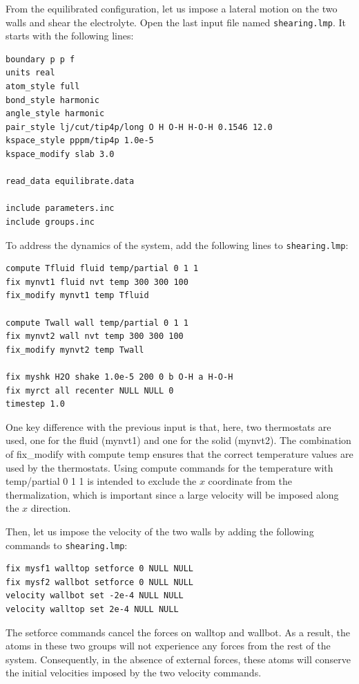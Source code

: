 \documentclass[9pt,tutorial]{livecoms}
\newcommand{\lmpcmd}[1]{\hspace{0pt}\colorbox{listing}{\textcolor{command}{\small{#1}}}\hspace{0pt}} %
\newcommand{\flecmd}[1]{\textcolor{command}{\texttt{#1}}} %
\begin{document}
From the equilibrated configuration, let us impose a lateral motion on the two
walls and shear the electrolyte.  Open the last input file named \flecmd{shearing.lmp}.
It starts with the following lines:
\begin{lstlisting}
boundary p p f
units real
atom_style full
bond_style harmonic
angle_style harmonic
pair_style lj/cut/tip4p/long O H O-H H-O-H 0.1546 12.0
kspace_style pppm/tip4p 1.0e-5
kspace_modify slab 3.0

read_data equilibrate.data

include parameters.inc
include groups.inc
\end{lstlisting}

To address the dynamics of the system, add the following lines to
\flecmd{shearing.lmp}:
\begin{lstlisting}
compute Tfluid fluid temp/partial 0 1 1
fix mynvt1 fluid nvt temp 300 300 100
fix_modify mynvt1 temp Tfluid

compute Twall wall temp/partial 0 1 1
fix mynvt2 wall nvt temp 300 300 100
fix_modify mynvt2 temp Twall

fix myshk H2O shake 1.0e-5 200 0 b O-H a H-O-H
fix myrct all recenter NULL NULL 0
timestep 1.0
\end{lstlisting}
One key difference with the previous input is that, here, two thermostats are used,
one for the fluid (\lmpcmd{mynvt1}) and one for the solid (\lmpcmd{mynvt2}).
The combination of \lmpcmd{fix\_modify} with \lmpcmd{compute temp} ensures
that the correct temperature values are used by the thermostats.  Using
\lmpcmd{compute} commands for the temperature with \lmpcmd{temp/partial 0 1 1} is
intended to exclude the $x$ coordinate from the thermalization, which is important since a
large velocity will be imposed along the $x$ direction.

Then, let us impose the velocity of the two walls by adding the following
commands to \flecmd{shearing.lmp}:
\begin{lstlisting}
fix mysf1 walltop setforce 0 NULL NULL
fix mysf2 wallbot setforce 0 NULL NULL
velocity wallbot set -2e-4 NULL NULL
velocity walltop set 2e-4 NULL NULL
\end{lstlisting}
The \lmpcmd{setforce} commands cancel the forces on \lmpcmd{walltop} and
\lmpcmd{wallbot}.  As a result, the atoms in these two groups will not
experience any forces from the rest of the system.  Consequently, in the absence of
external forces, these atoms will conserve the initial velocities imposed by the
two \lmpcmd{velocity} commands.
\end{document}
